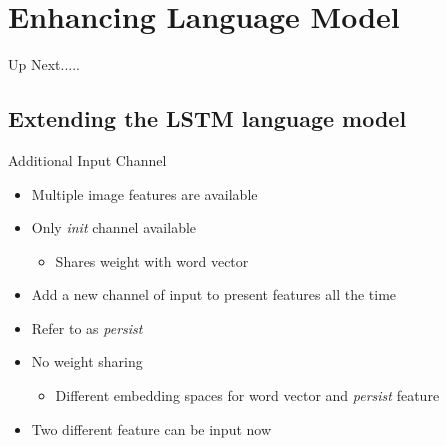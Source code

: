 \documentclass{beamer}
\begin{document}
\section{Enhancing Language Model}
\begin{frame}{Up Next.....}
\tableofcontents[currentsection] 
\end{frame}
\subsection{Extending the LSTM language model}
\begin{frame}{Additional Input Channel}
    \begin{itemize}
        \item Multiple image features are available 
        \item Only \emph{init} channel available 
            \begin{itemize}
                \item Shares weight with word vector
            \end{itemize}
        \item Add a new channel of input to present features all the time
        \item Refer to as \emph{persist}
        \item No weight sharing 
            \begin{itemize}
                \item Different embedding spaces for word vector and \emph{persist} feature 
            \end{itemize}
        \item Two different feature can be input now 
    \end{itemize}
\end{frame}
\end{document}
